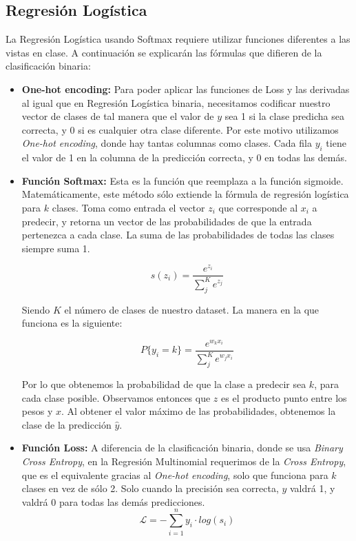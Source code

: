 \documentclass[conference]{IEEEtran}
\begin{document}
\subsection{Regresión Logística}
La Regresión Logística usando Softmax requiere utilizar funciones diferentes a las vistas en clase. A continuación se explicarán las fórmulas que difieren de la clasificación binaria:
\begin{itemize}
\item \textbf{One-hot encoding:}
Para poder aplicar las funciones de Loss y las derivadas al igual que en Regresión Logística binaria, necesitamos codificar nuestro vector de clases de tal manera que el valor de $y$ sea 1 si la clase predicha sea correcta, y 0 si es cualquier otra clase diferente. Por este motivo utilizamos \textit{One-hot encoding}, donde hay tantas columnas como clases. Cada fila $y_i$ tiene el valor de 1 en la columna de la predicción correcta, y 0 en todas las demás.

\item \textbf{Función Softmax:}
Esta es la función que reemplaza a la función sigmoide. Matemáticamente, este método sólo extiende la fórmula de regresión logística para $k$ clases. Toma como entrada el vector $z_i$ que corresponde al $x_i$ a predecir, y retorna un vector de las probabilidades de que la entrada pertenezca a cada clase. La suma de las probabilidades de todas las clases siempre suma 1.

\[s(z_i) = \frac{e^{z_i}}{\sum_j^K e^{z_j}}\]

Siendo $K$ el número de clases de nuestro dataset.
La manera en la que funciona es la siguiente:

\[P\{y_i=k\} = \frac{e^{w_kx_i}}{\sum_j^K e^{w_jx_i}}\]

Por lo que obtenemos la probabilidad de que la clase a predecir sea $k$, para cada clase posible. Observamos entonces que $z$ es el producto punto entre los pesos y $x$. Al obtener el valor máximo de las probabilidades, obtenemos la clase de la predicción $\hat{y}$.
\vspace{0.5cm}
\item \textbf{Función Loss:}
A diferencia de la clasificación binaria, donde se usa \textit{Binary Cross Entropy}, en la Regresión Multinomial requerimos de la \textit{Cross Entropy}, que es el equivalente gracias al \textit{One-hot encoding}, solo que funciona para $k$ clases en vez de sólo 2. Solo cuando la precisión sea correcta, $y$ valdrá 1, y valdrá 0 para todas las demás predicciones.
\[\mathcal{L} = -\sum_{i=1}^{n}y_i \cdot log(s_i)\]


\end{itemize}
\end{document}
